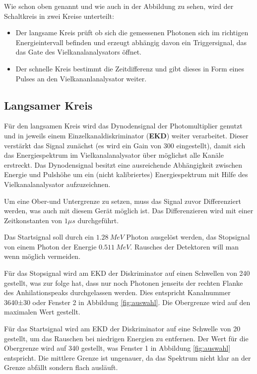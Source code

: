 \documentclass[a4paper,12pt]{article}
\begin{document}
Wie schon oben genannt und wie auch in der Abbildung zu sehen, wird der Schaltkreis in zwei Kreise unterteilt:
\begin{itemize}
	\item
	Der langsame Kreis prüft ob sich die gemessenen Photonen sich im richtigen Energieintervall 
	befinden und erzeugt abhängig davon ein Triggersignal, das das Gate des Vielkanalanalysators öffnet.
	\item
		Der schnelle Kreis bestimmt die Zeitdifferenz und gibt dieses in Form eines Pulses an den
	Vielkananlanalysator weiter.
\end{itemize}
\subsection*{Langsamer Kreis}
Für den langsamen Kreis wird das Dynodensignal der Photomultiplier genutzt und in jeweils einem
Einzelkanaldiskriminator (\textbf{EKD}) weiter verarbeitet.
Dieser verstärkt das Signal zunächst (es wird ein Gain von 300 eingestellt),
damit sich das Energiespektrum im Vielkanalanalysator über möglichst alle Kanäle erstreckt.
Das Dynodensignal besitzt eine ausreichende Abhängigkeit zwischen Energie und Pulshöhe
um ein (nicht kalibriertes) Energiespektrum mit Hilfe des Vielkanalanalysator aufzuzeichnen.

Um eine Ober-und Untergrenze zu setzen, muss das Signal zuvor Differenziert werden,
was auch mit diesem Gerät möglich ist\cite{linearAmplifier}. Das Differenzieren wird mit einer
Zeitkonstanten von $1μs$ durchgeführt.

Das Startsignal soll durch ein $\SI{1.28}{MeV}$ Photon ausgelöst werden, das Stopsignal von einem
Photon der Energie $\SI{0.511}{MeV}$. Rausches der Detektoren will man wenn möglich vermeiden.

Für das Stopsignal wird am EKD der Diskriminator auf einen Schwellen von 240 gestellt, was zur
folge hat, dass nur noch Photonen jenseits der rechten Flanke des Anhilationspeaks durchgelassen
werden. Dies entspricht Kanalnummer 3640±30 oder Fenster 2 in Abbildung \ref{fig:auswahl}. Die
Obergrenze wird auf den maximalen Wert gestellt.

Für das Startsignal wird am EKD der Diskriminator auf eine Schwelle von 20 gestellt, um das Rauschen
bei niedrigen Energien zu entfernen. Der Wert für die Obergrenze wird auf 340 gestellt, was Fenster
1 in Abbildung \ref{fig:auswahl} entspricht.
Die mittlere Grenze ist ungenauer, da das Spektrum nicht klar an der Grenze abfällt sondern flach
ausläuft.
\end{document}
